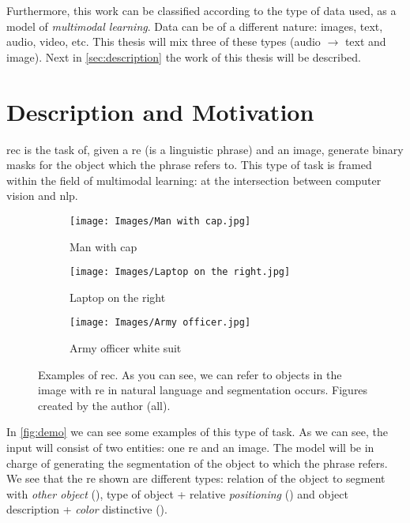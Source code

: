 Furthermore, this work can be classified according to the type of data used, as
a model of \emph{multimodal learning}. Data can be
of a different nature: images, text, audio, video, etc. This thesis will mix
three of these types (audio \(\rightarrow\) text and image). Next in
\vref{sec:description} the work of this thesis will be described.



\section{Description and Motivation}\label{sec:description}

\gls{rec} is the task of, given a \gls{re} (is a linguistic phrase) and an
image, generate binary masks for the object which the phrase refers to. This
type of task is framed within the field of multimodal learning: at the
intersection between computer vision and \gls{nlp}.

\begin{figure}[ht]
  \centering
  \begin{subfigure}[t]{.32\textwidth}
    \centering
    \caption{Man with cap}
    \texttt{[image: Images/Man with cap.jpg]}
  \end{subfigure}\hfill
  \begin{subfigure}[t]{.32\textwidth}
    \centering
    \caption{Laptop on the right}
    \texttt{[image: Images/Laptop on the right.jpg]}
  \end{subfigure}\hfill
  \begin{subfigure}[t]{.32\textwidth}
    \centering
    \caption{Army officer white suit}
    \texttt{[image: Images/Army officer.jpg]}
  \end{subfigure}
  \caption[Examples of ]{Examples of \acl{rec}. As you can
    see, we can refer to objects in the image with \gls{re} in natural language
    and segmentation occurs. Figures created by the author
    (all).}\label{fig:demo}
\end{figure}

In \vref{fig:demo} we can see some examples of this type of task. As we can
see, the input will consist of two entities: one \gls{re} and an image. The
model will be in charge of generating the segmentation of the object to which
the phrase refers. We see that the \gls{re} shown are different types: relation
of the object to segment with \emph{other object} (), type
of object + relative \emph{positioning} () and object
description + \emph{color} distinctive ().

